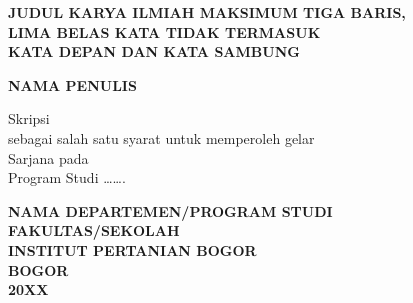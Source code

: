 
\clearpage
\thispagestyle{empty}
\begin{center}


\vspace*{1cm}

{\fontsize{14pt}{17pt}\selectfont\bfseries
JUDUL KARYA ILMIAH MAKSIMUM TIGA BARIS,\\
LIMA BELAS KATA TIDAK TERMASUK\\
KATA DEPAN DAN KATA SAMBUNG
}

\vspace{4cm}

{\fontsize{14pt}{17pt}\selectfont\bfseries
NAMA PENULIS
}

\vspace{4cm}

{\fontsize{12pt}{14pt}\selectfont
Skripsi\\
sebagai salah satu syarat untuk memperoleh gelar\\
Sarjana pada\\
Program Studi \ldots\ldots.
}

\vfill

{\fontsize{14pt}{17pt}\selectfont\bfseries
NAMA DEPARTEMEN/PROGRAM STUDI\\
FAKULTAS/SEKOLAH\\
INSTITUT PERTANIAN BOGOR\\
BOGOR\\
20XX
}

\end{center}
\clearpage